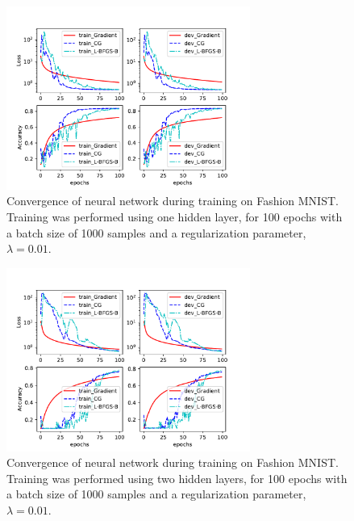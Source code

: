 \documentclass[nohyperref]{article}
\theoremstyle{plain}
\theoremstyle{definition}
\theoremstyle{remark}
\begin{document}
\begin{figure}[!ht]
\centering
\includegraphics[height=6cm, width=8cm]{../src-mnist/compare_solvers_newtest_100_reg_0pt01_lr_0pt4.pdf}
\caption{Convergence of neural network during training on Fashion MNIST. Training was performed using one hidden layer, for 100 epochs with a batch size of 1000 samples and a regularization parameter, $\lambda=0.01$.}\label{NN_1layer}
\end{figure}

\begin{figure}[!ht]
\centering
\includegraphics[height=6cm, width=8cm]{../src-mnist/compare_solvers_nL_2_nepoch_100_reg_0pt01_lr_0pt4.pdf}
\caption{Convergence of neural network during training on Fashion MNIST. Training was performed using two hidden layers, for 100 epochs with a batch size of 1000 samples and a regularization parameter, $\lambda=0.01$.}\label{NN_2layer}
\end{figure}

\newpage

%
%
\end{document}
